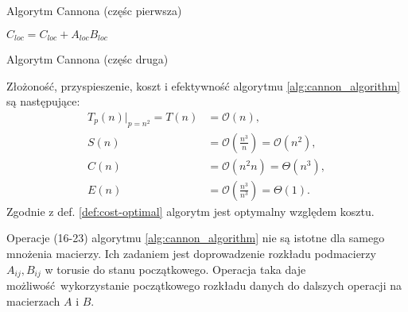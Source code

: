 \begin{algorithm}[h]
\centering
\begin{algorithmic}[1]
\item[]
 
\EndFor
{}
\EndFor
{}
\end{algorithmic}
\caption{Algorytm Cannona\cite{Golub} (częśc pierwsza)}
\end{algorithm}

\begin{algorithm}[h]
\ContinuedFloat
\centering
\begin{algorithmic}[1]
 
	\State \(C_{loc}=C_{loc} + A_{loc}B_{loc}\)
\EndFor
{} 
	 
\EndFor
{}
\EndFor
\end{algorithmic}
\caption{Algorytm Cannona\cite{Golub} (częśc druga)}
\label{alg:cannon_algorithm}
\end{algorithm}

Złożoność, przyspieszenie, koszt i efektywność algorytmu \ref{alg:cannon_algorithm} są następujące\cite{Czech}:
\begin{align*}
T_p(n)|_{p=n^2} = T(n) &= \mathcal{O}(n), \\
S(n) &= \mathcal{O}(\frac{n^3}{n}) = \mathcal{O}(n^2), \\
C(n) &= \mathcal{O}(n^2n)=\Theta(n^3), \\
E(n) &= \mathcal{O}(\frac{n^3}{n^3})=\Theta(1).
\end{align*}
Zgodnie z def. \ref{def:cost-optimal} algorytm jest optymalny względem kosztu.

Operacje (16-23) algorytmu \ref{alg:cannon_algorithm} nie są istotne dla samego mnożenia macierzy. Ich zadaniem jest doprowadzenie rozkładu podmacierzy \(A_{ij}, B_{ij}\) w torusie do stanu początkowego. Operacja taka daje możliwość wykorzystanie początkowego rozkładu danych do dalszych operacji na macierzach \(A\) i \(B\).